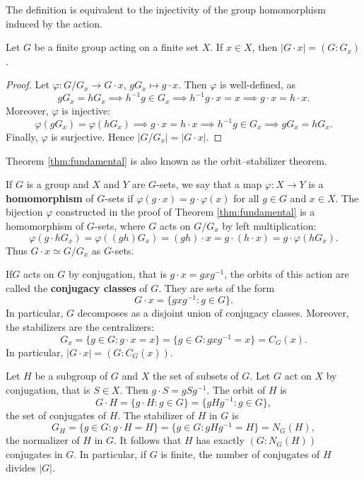 The definition is equivalent to the injectivity of 
the group homomorphism induced
by the action. 

\begin{theorem}
\label{thm:fundamental}
Let $G$ be a finite group acting on a finite set $X$. If 
$x\in X$, then $|G\cdot x|=(G:G_x)$.
\end{theorem}

\begin{proof}
    Let $\varphi\colon G/G_x\to G\cdot x$, $gG_x\mapsto g\cdot x$. Then $\varphi$ is well-defined, as 
        \[
        gG_x=hG_x\implies h^{-1}g\in G_x
        \implies h^{-1}g\cdot x=x\implies g\cdot x=h\cdot x.
        \]
    Moreover, $\varphi$ is injective: 
        \[
        \varphi(gG_x)=\varphi(hG_x)\implies
        g\cdot x=h\cdot x\implies
        h^{-1}g\in G_x\implies gG_x=hG_x.
        \]
    Finally, $\varphi$ is surjective. Hence 
    $|G/G_x|=|G\cdot x|$.
\end{proof}

Theorem \ref{thm:fundamental} is also known 
as the orbit--stabilizer theorem. 

If $G$ is a group and $X$ and $Y$ are $G$-sets, 
we say that a map $\varphi\colon X\to Y$ is a 
\textbf{homomorphism} of $G$-sets if $\varphi(g\cdot x)=g\cdot \varphi(x)$ for all $g\in G$ and $x\in X$. The bijection 
$\varphi$ constructed in the proof of Theorem \ref{thm:fundamental}
is a homomorphism of $G$-sets, where
$G$ acts on $G/G_x$ by left multiplication: 
\[
\varphi(g\cdot hG_x)=\varphi((gh)G_x)=(gh)\cdot x=g\cdot (h\cdot x)=g\cdot\varphi(hG_x).
\]
Thus $G\cdot x\simeq G/G_x$ as $G$-sets.

\begin{example}
    If$G$ acts on $G$ by conjugation, that is $g\cdot x=gxg^{-1}$, the orbits of this action are called the \textbf{conjugacy classes} 
    of $G$. They are sets of the form
        \[
        G\cdot x=\{gxg^{-1}:g\in G\}.
        \]
    In particular, $G$ decomposes as a disjoint union of conjugacy classes. Moreover, 
    the stabilizers are the centralizers:
        \[
        G_x=\{g\in G:g\cdot x=x\}=\{g\in G:gxg^{-1}=x\}=C_G(x).
        \]
    In particular, $|G\cdot x|=(G:C_G(x))$.
\end{example}

\begin{example}
    Let $H$ be a subgroup of $G$ and $X$ the set of subsets of $G$. Let $G$ act on 
    $X$ by conjugation, that is $S\in X$. Then
        $g\cdot S=gSg^{-1}$. The orbit of $H$ 
        is 
        \[
        G\cdot H=\{g\cdot H:g\in G\}=\{gHg^{-1}:g\in G\},
        \]
        the set of conjugates of $H$. The stabilizer of $H$ in $G$ 
        is 
        \[
        G_H=\{g\in G:g\cdot H=H\}=\{g\in G:gHg^{-1}=H\}=N_G(H),
        \]
        the normalizer of $H$ in $G$. It follows that
        $H$ has exactly $(G:N_G(H))$ conjugates in $G$. In particular,
        if $G$ is finite, 
        the number of conjugates of $H$ divides $|G|$. 
\end{example}

